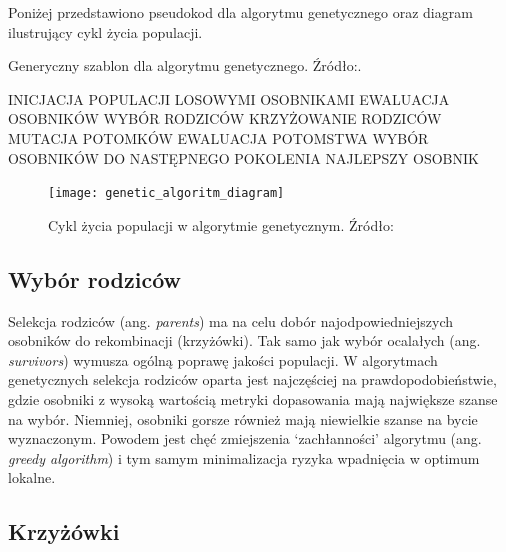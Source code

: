 \documentclass[a4paper,11pt]{article}
\begin{document}
    \bigskip

    Poniżej przedstawiono pseudokod dla algorytmu genetycznego oraz diagram ilustrujący cykl życia populacji.

    \smallskip

    \begin{algorithm}[H]
        \label{alg:genetic_algorithm_template}
        \caption{Generyczny szablon dla algorytmu genetycznego. Źródło:\cite{IntroductionToEvolutionaryComputing2015}.}
        \begin{algorithmic}
            \State INICJACJA POPULACJI LOSOWYMI OSOBNIKAMI
            \State EWALUACJA OSOBNIKÓW
                \State WYBÓR RODZICÓW
                \State KRZYŻOWANIE RODZICÓW
                \State MUTACJA POTOMKÓW
                \State EWALUACJA POTOMSTWA
                \State WYBÓR OSOBNIKÓW DO NASTĘPNEGO POKOLENIA
            \EndWhile
            \State \Return NAJLEPSZY OSOBNIK
        \end{algorithmic}
    \end{algorithm}

    \bigskip

    \begin{figure}[H]
        \label{fig:genetic_algoritm_diagram}
        \centering
        \texttt{[image: genetic\_algoritm\_diagram]}
        \caption{Cykl życia populacji w algorytmie genetycznym. Źródło:\cite{IntroductionToEvolutionaryComputing2015}}
    \end{figure}

    \subsection{Wybór rodziców}

    Selekcja rodziców (ang. \textit{parents}) ma na celu dobór najodpowiedniejszych osobników do rekombinacji (krzyżówki). Tak samo jak wybór ocalałych (ang. \textit{survivors}) wymusza ogólną poprawę jakości populacji. W algorytmach genetycznych selekcja rodziców oparta jest najczęściej na prawdopodobieństwie, gdzie osobniki z wysoką wartością metryki dopasowania mają największe szanse na wybór. Niemniej, osobniki gorsze również mają niewielkie szanse na bycie wyznaczonym. Powodem jest chęć zmiejszenia `zachłanności' algorytmu (ang. \textit{greedy algorithm}) i tym samym minimalizacja ryzyka wpadnięcia w optimum lokalne\cite{IntroductionToEvolutionaryComputing2015}.

    \subsection{Krzyżówki}
\end{document}
